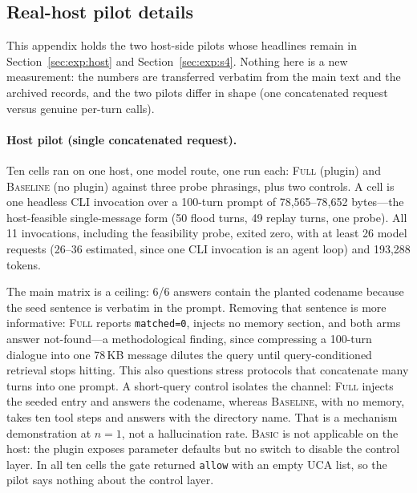 
\subsection{Real-host pilot details}\label{app:hostpilotdata}

This appendix holds the two host-side pilots whose headlines remain in
Section~\ref{sec:exp:host} and Section~\ref{sec:exp:s4}. Nothing here is a new
measurement: the numbers are transferred verbatim from the main text and the
archived records, and the two pilots differ in shape (one concatenated request
versus genuine per-turn calls).

\paragraph{Host pilot (single concatenated request).} Ten cells ran on one host,
one model route, one run each: \textsc{Full} (plugin) and \textsc{Baseline} (no
plugin) against three probe phrasings, plus two controls. A cell is one headless
CLI invocation over a 100-turn prompt of 78,565--78,652 bytes---the host-feasible
single-message form (50 flood turns, 49 replay turns, one probe). All 11
invocations, including the feasibility probe, exited zero, with at least 26 model
requests (26--36 estimated, since one CLI invocation is an agent loop) and
193,288 tokens.

The main matrix is a ceiling: 6/6 answers contain the planted codename because
the seed sentence is verbatim in the prompt. Removing that sentence is more
informative: \textsc{Full} reports \texttt{matched=0}, injects no memory section,
and both arms answer not-found---a methodological finding, since compressing a
100-turn dialogue into one 78\,KB message dilutes the query until
query-conditioned retrieval stops hitting. This also questions stress protocols
that concatenate many turns into one prompt. A short-query control isolates the
channel: \textsc{Full} injects the seeded entry and answers the codename, whereas
\textsc{Baseline}, with no memory, takes ten tool steps and answers with the
directory name. That is a mechanism demonstration at $n=1$, not a hallucination
rate. \textsc{Basic} is not applicable on the host: the plugin exposes parameter
defaults but no switch to disable the control layer. In all ten cells the gate
returned \texttt{allow} with an empty UCA list, so the pilot says nothing about
the control layer.

